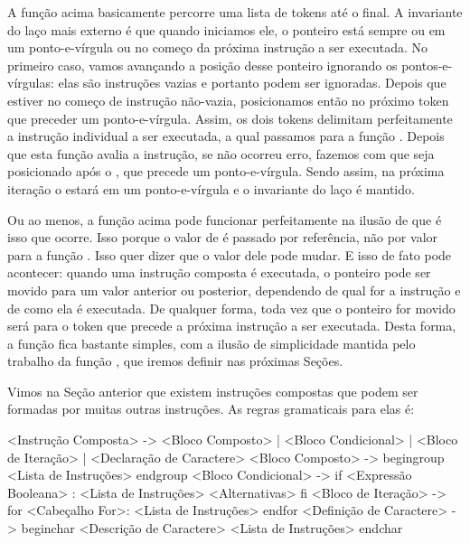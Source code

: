 A função acima basicamente percorre uma lista de tokens até o final.
A invariante do laço  mais externo é que quando
iniciamos ele, o ponteiro  está sempre ou em um
ponto-e-vírgula ou no começo da próxima instrução a ser executada. No
primeiro caso, vamos avançando a posição desse ponteiro ignorando os
pontos-e-vírgulas: elas são instruções vazias e portanto podem ser
ignoradas. Depois que  estiver no começo de
instrução não-vazia, posicionamos então  no próximo
token que preceder um ponto-e-vírgula. Assim, os dois tokens delimitam
perfeitamente a instrução individual a ser executada, a qual passamos
para a função . Depois que esta função
avalia a instrução, se não ocorreu erro, fazemos com
que  seja posicionado após o , que
precede um ponto-e-vírgula. Sendo assim, na próxima iteração
o  estará em um ponto-e-vírgula e o invariante do
laço é mantido.

Ou ao menos, a função acima pode funcionar perfeitamente na ilusão de
que é isso que ocorre. Isso porque o valor de  é
passado por referência, não por valor para a
função . Isso quer dizer que o valor dele
pode mudar. E isso de fato pode acontecer: quando uma instrução
composta é executada, o ponteiro pode ser movido para um valor
anterior ou posterior, dependendo de qual for a instrução e de como
ela é executada. De qualquer forma, toda vez que o ponteiro for movido
será para o token que precede a próxima instrução a ser
executada. Desta forma, a
função  fica bastante simples,
com a ilusão de simplicidade mantida pelo trabalho da
função , que iremos definir nas próximas
Seções.



Vimos na Seção anterior que existem instruções compostas que podem ser
formadas por muitas outras instruções. As regras gramaticais para elas é:

\alinhaverbatim
<Instrução Composta> -> <Bloco Composto> |
                        <Bloco Condicional> |
                        <Bloco de Iteração> |
                        <Declaração de Caractere>
<Bloco Composto> -> begingroup <Lista de Instruções> endgroup
<Bloco Condicional> -> if <Expressão Booleana> :
                         <Lista de Instruções>
                         <Alternativas>
                       fi
<Bloco de Iteração> -> for <Cabeçalho For>:
                         <Lista de Instruções>
                       endfor
<Definição de Caractere> -> beginchar <Descrição de Caractere>
                              <Lista de Instruções>
                            endchar
\alinhanormal

